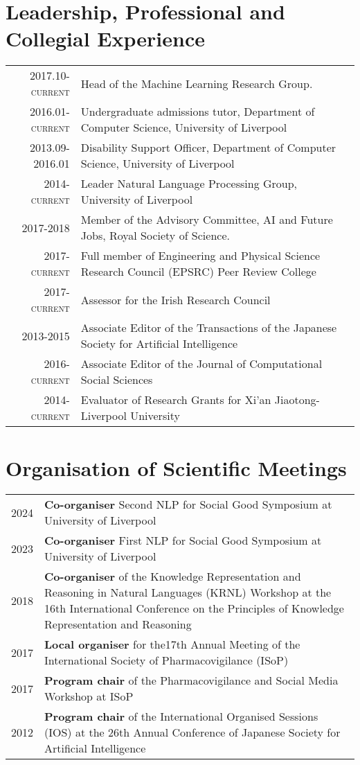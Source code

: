 \documentclass[a4paper,11pt]{article}
\begin{document}
\section{Leadership, Professional and Collegial Experience}
\begin{tabular}{r p{11cm}}
\textsc{2017.10-current} & Head of the Machine Learning Research Group.\\
\textsc{2016.01-current} & Undergraduate admissions tutor, Department of Computer Science, University of Liverpool \\
\textsc{2013.09-2016.01} & Disability Support Officer, Department of Computer Science, University of Liverpool \\
\textsc{2014-current} & Leader Natural Language Processing Group, University of Liverpool\\
\textsc{2017-2018} & Member of the Advisory Committee, AI and Future Jobs, Royal Society of Science.\\
\textsc{2017-current} & Full member of Engineering and  Physical Science Research Council (EPSRC) Peer Review College \\
\textsc{2017-current} & Assessor for the Irish Research Council \\
\textsc{2013-2015} & Associate Editor of the Transactions of the Japanese Society for Artificial Intelligence\\
\textsc{2016-current} & Associate Editor of the Journal of Computational Social Sciences\\
\textsc{2014-current} & Evaluator of Research Grants for Xi'an Jiaotong-Liverpool University
\end{tabular}

\section{Organisation of Scientific Meetings}
\begin{tabular}{r p{13cm}}

\textsc{2024} & \textbf{Co-organiser} Second NLP for Social Good Symposium at University of Liverpool\\
\textsc{2023} & \textbf{Co-organiser} First NLP for Social Good Symposium at University of Liverpool\\
\textsc{2018} & \textbf{Co-organiser} of the Knowledge Representation and Reasoning in Natural Languages (KRNL) Workshop at the 16th International Conference on the Principles of Knowledge Representation and Reasoning\\
\textsc{2017} & \textbf{Local organiser} for the17th Annual Meeting of the International Society of Pharmacovigilance (ISoP)\\
\textsc{2017} & \textbf{Program chair} of the Pharmacovigilance and Social Media Workshop at ISoP\\
\textsc{2012} & \textbf{Program chair} of the International Organised Sessions (IOS) at the 26th Annual Conference of Japanese Society for Artificial Intelligence
\end{tabular}
\end{document}
